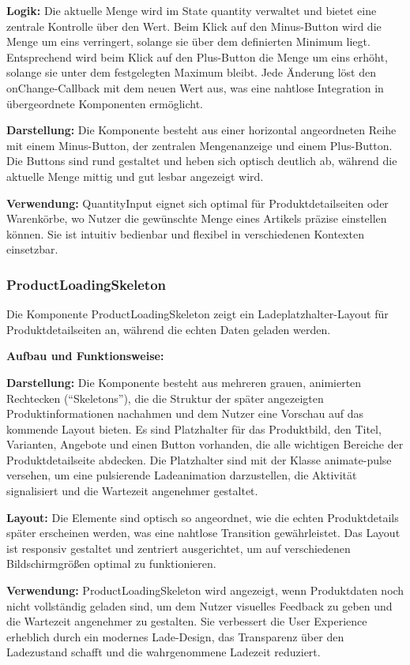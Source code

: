 \textbf{Logik:}
Die aktuelle Menge wird im State quantity verwaltet und bietet eine zentrale Kontrolle über den Wert. Beim Klick auf den Minus-Button wird die Menge um eins verringert, solange sie über dem definierten Minimum liegt. Entsprechend wird beim Klick auf den Plus-Button die Menge um eins erhöht, solange sie unter dem festgelegten Maximum bleibt. Jede Änderung löst den onChange-Callback mit dem neuen Wert aus, was eine nahtlose Integration in übergeordnete Komponenten ermöglicht.

\textbf{Darstellung:}
Die Komponente besteht aus einer horizontal angeordneten Reihe mit einem Minus-Button, der zentralen Mengenanzeige und einem Plus-Button. Die Buttons sind rund gestaltet und heben sich optisch deutlich ab, während die aktuelle Menge mittig und gut lesbar angezeigt wird.

\noindent\textbf{Verwendung:} QuantityInput eignet sich optimal für Produktdetailseiten oder Warenkörbe, wo Nutzer die gewünschte Menge eines Artikels präzise einstellen können. Sie ist intuitiv bedienbar und flexibel in verschiedenen Kontexten einsetzbar.

\subsubsection{ProductLoadingSkeleton}
Die Komponente ProductLoadingSkeleton zeigt ein Ladeplatzhalter-Layout für Produktdetailseiten an, während die echten Daten geladen werden.

\noindent\textbf{Aufbau und Funktionsweise:}

\textbf{Darstellung:}
Die Komponente besteht aus mehreren grauen, animierten Rechtecken (``Skeletons''), die die Struktur der später angezeigten Produktinformationen nachahmen und dem Nutzer eine Vorschau auf das kommende Layout bieten. Es sind Platzhalter für das Produktbild, den Titel, Varianten, Angebote und einen Button vorhanden, die alle wichtigen Bereiche der Produktdetailseite abdecken. Die Platzhalter sind mit der Klasse animate-pulse versehen, um eine pulsierende Ladeanimation darzustellen, die Aktivität signalisiert und die Wartezeit angenehmer gestaltet.

\textbf{Layout:}
Die Elemente sind optisch so angeordnet, wie die echten Produktdetails später erscheinen werden, was eine nahtlose Transition gewährleistet. Das Layout ist responsiv gestaltet und zentriert ausgerichtet, um auf verschiedenen Bildschirmgrößen optimal zu funktionieren.

\noindent\textbf{Verwendung:} ProductLoadingSkeleton wird angezeigt, wenn Produktdaten noch nicht vollständig geladen sind, um dem Nutzer visuelles Feedback zu geben und die Wartezeit angenehmer zu gestalten. Sie verbessert die User Experience erheblich durch ein modernes Lade-Design, das Transparenz über den Ladezustand schafft und die wahrgenommene Ladezeit reduziert.

